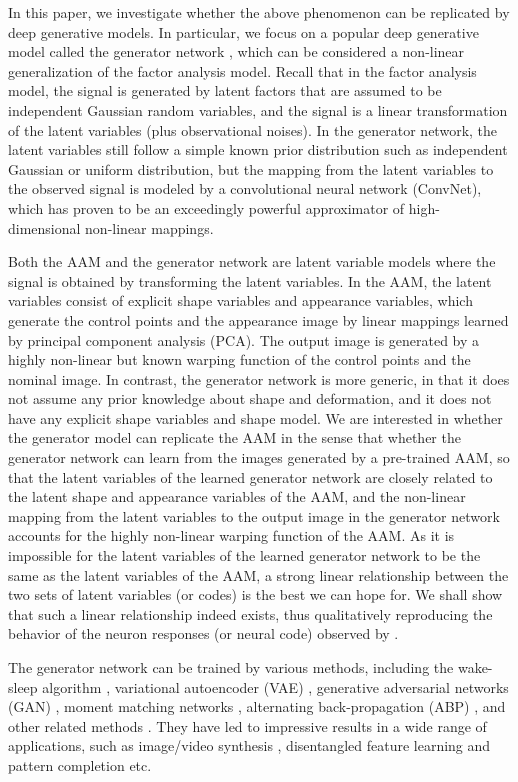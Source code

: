 \documentclass{article}
\begin{document}
In this paper, we investigate whether the above phenomenon can be replicated by deep generative models. In particular, we focus on a popular deep generative model called the  {generator network} \cite{goodfellow2014generative}, which can be considered a non-linear generalization of the factor analysis model. Recall that in the factor analysis model, the signal is generated by latent factors  that are assumed to be independent Gaussian random variables, and the signal is a linear transformation of the latent variables (plus observational noises). In the generator network, the latent variables still follow a simple known prior distribution such as independent Gaussian or uniform distribution, but the mapping from the latent variables to the observed signal is modeled by a convolutional neural network (ConvNet), which has proven to be an exceedingly powerful approximator of high-dimensional non-linear mappings. 

Both the AAM and the generator network are latent variable models where the signal is obtained by transforming the latent variables. In the AAM, the latent variables consist of explicit shape variables and appearance variables, which generate the control points and the appearance image by linear mappings learned by principal component analysis (PCA). The output image is generated by a highly non-linear but known warping function of the control points and the nominal image. In contrast, the generator network is more generic, in that it does not assume any prior knowledge about shape and deformation, and it does not have any explicit shape variables and shape model. We are interested in whether the generator model can replicate the AAM in the sense that whether the generator network can learn from the images generated by a pre-trained AAM, so that the latent variables of the learned generator network are closely related to the latent shape and appearance variables of the AAM, and the non-linear mapping from the latent variables to the output image in the generator network accounts for the highly non-linear warping function of the AAM. As it is impossible for the latent variables of the learned generator network to be the same as the latent variables of the AAM, a strong linear relationship between the two sets of latent variables (or codes) is the best we can hope for. We shall show that such a linear relationship indeed exists, thus qualitatively reproducing the behavior of the neuron responses (or neural code) observed by \cite{chang2017code}. 

The generator network can be trained by various methods, including the wake-sleep algorithm \cite{hinton1995wake}, variational autoencoder (VAE) \cite{KingmaCoRR13,RezendeICML2014,salimans2015markov}, generative adversarial networks (GAN) \cite{goodfellow2014generative,radford2015unsupervised,denton2015deep}, moment matching networks \cite{li2015generative}, alternating back-propagation (ABP) \cite{Han2017}, and other related methods \cite{oord2016pixel,Dinh2016DensityEU}. They have led to impressive results in a wide range of applications, such as image/video synthesis \cite{Alexey2015}, disentangled feature learning \cite{chen2016infogan,higgins2016beta} and pattern completion \cite{Han2017} etc. 
\end{document}
